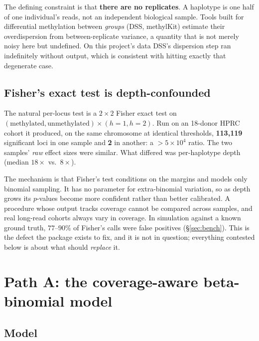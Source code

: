 \documentclass[11pt]{article}
\newcommand{\hpone}{h{=}1}
\newcommand{\hptwo}{h{=}2}
\begin{document}
The defining constraint is that \textbf{there are no replicates}. A haplotype is
one half of one individual's reads, not an independent biological sample. Tools
built for differential methylation between \emph{groups} (DSS, methylKit) estimate
their overdispersion from between-replicate variance, a quantity that is not
merely noisy here but undefined. On this project's data DSS's dispersion step ran
indefinitely without output, which is consistent with hitting exactly that
degenerate case.

\subsection{Fisher's exact test is depth-confounded}

The natural per-locus test is a $2\times2$ Fisher exact test on
$(\text{methylated}, \text{unmethylated}) \times (\hpone, \hptwo)$. Run on an
18-donor HPRC cohort it produced, on the same chromosome at identical
thresholds, \textbf{113{,}119} significant loci in one sample and \textbf{2} in
another: a $>5\times10^{4}$ ratio. The two samples' \emph{raw} effect sizes were
similar. What differed was per-haplotype depth (median $18\times$ vs.\ $8\times$).

The mechanism is that Fisher's test conditions on the margins and models only
binomial sampling. It has no parameter for extra-binomial variation, so as depth
grows its $p$-values become more confident rather than better calibrated. A
procedure whose output tracks coverage cannot be compared across samples, and
real long-read cohorts always vary in coverage. In simulation against a known
ground truth, $77$--$90\%$ of Fisher's calls were false positives
(\S\ref{sec:bench}). This is the defect the package exists to fix, and it is not
in question; everything contested below is about what should \emph{replace} it.

\section{Path A: the coverage-aware beta-binomial model}
\label{sec:bb}

\subsection{Model}
\end{document}
